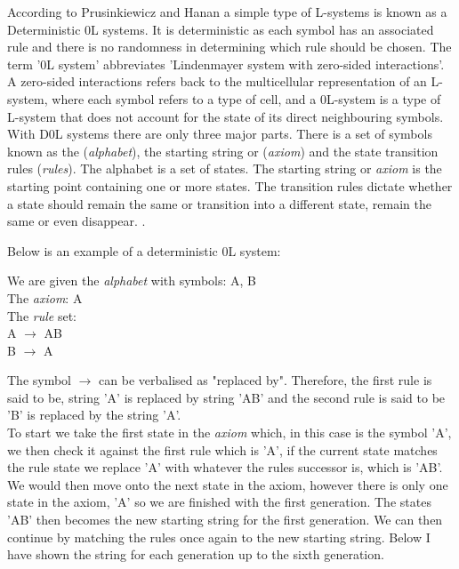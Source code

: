 \begin{flushleft}

According to Prusinkiewicz and Hanan a simple type of L-systems is known as a Deterministic 0L systems. It is deterministic as each symbol has an associated rule and there is no randomness in determining which rule should be chosen. The term '0L system' abbreviates 'Lindenmayer system with zero-sided interactions'. A zero-sided interactions refers back to the multicellular representation of an L-system, where each symbol refers to a type of cell, and a 0L-system is a type of L-system that does not account for the state of its direct neighbouring symbols. With D0L systems there are only three major parts. There is a set of symbols known as the (\textit{alphabet}), the starting string or (\textit{axiom}) and the state transition rules (\textit{rules}). The alphabet is a set of states. The starting string or \textit{axiom} is the starting point containing one or more states. The transition rules dictate whether a state should remain the same or transition into a different state, remain the same or even disappear. \cite{prusinkiewicz2013lindenmayer}. \\

\vspace{5mm}

Below is an example of a deterministic 0L system: \\

\vspace{5mm}

We are given the \textit{alphabet} with symbols: A, B \\ 
The \textit{axiom}: A \\
The \textit{rule} set: \\ 
A $\rightarrow$ AB \\
B $\rightarrow$ A \\

\vspace{5mm}

The symbol $\rightarrow$ can be verbalised as "replaced by". Therefore, the first rule is said to be, string 'A' is replaced by string 'AB' and the second rule is said to be 'B' is replaced by the string 'A'.\\
To start we take the first state in the \textit{axiom} which, in this case is the symbol 'A', we then check it against the first rule which is 'A', if the current state matches the rule state we replace 'A' with whatever the rules successor is, which is 'AB'. We would then move onto the next state in the axiom, however there is only one state in the axiom, 'A' so we are finished with the first generation. The states 'AB' then becomes the new starting string for the first generation. We can then continue by matching the rules once again to the new starting string. Below I have shown the string for each generation up to the sixth generation.\\


\end{flushleft}
